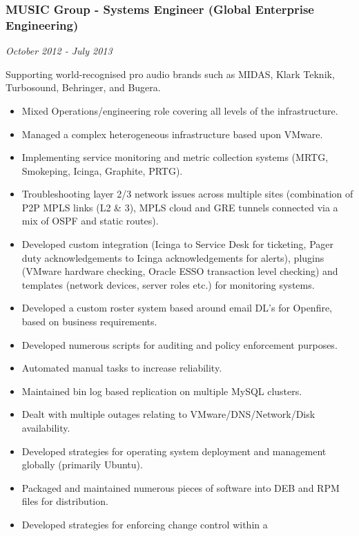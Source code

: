 \subsubsection{MUSIC Group - Systems Engineer (Global Enterprise
Engineering)}\label{music-group---systems-engineer-global-enterprise-engineering}

\emph{October 2012 - July 2013}

Supporting world-recognised pro audio brands such as MIDAS, Klark
Teknik, Turbosound, Behringer, and Bugera.

\begin{itemize}
\tightlist
\item
  Mixed Operations/engineering role covering all levels of the
  infrastructure.
\item
  Managed a complex heterogeneous infrastructure based upon VMware.
\item
  Implementing service monitoring and metric collection systems (MRTG,
  Smokeping, Icinga, Graphite, PRTG).
\item
  Troubleshooting layer 2/3 network issues across multiple sites
  (combination of P2P MPLS links (L2 \& 3), MPLS cloud and GRE tunnels
  connected via a mix of OSPF and static routes).
\item
  Developed custom integration (Icinga to Service Desk for ticketing,
  Pager duty acknowledgements to Icinga acknowledgements for alerts),
  plugins (VMware hardware checking, Oracle ESSO transaction level
  checking) and templates (network devices, server roles etc.) for
  monitoring systems.
\item
  Developed a custom roster system based around email DL's for Openfire,
  based on business requirements.
\item
  Developed numerous scripts for auditing and policy enforcement
  purposes.
\item
  Automated manual tasks to increase reliability.
\item
  Maintained bin log based replication on multiple MySQL clusters.
\item
  Dealt with multiple outages relating to VMware/DNS/Network/Disk
  availability.
\item
  Developed strategies for operating system deployment and management
  globally (primarily Ubuntu).
\item
  Packaged and maintained numerous pieces of software into DEB and RPM
  files for distribution.
\item
  Developed strategies for enforcing change control within a

\end{itemize}
